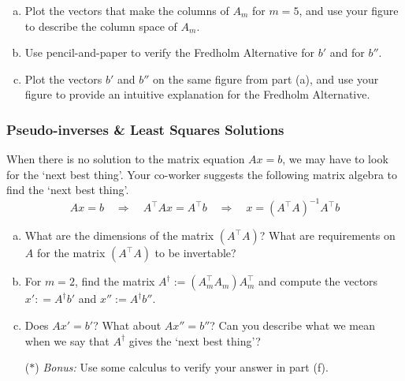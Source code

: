 \begin{enumerate}[(a)]
    \item Plot the vectors that make the columns of $A_m$ for $m = 5$, and use your figure to describe the column space of $A_m$.
    \item Use pencil-and-paper to verify the Fredholm Alternative for $b'$ and for $b''$.
    \item Plot the vectors $b'$ and $b''$ on the same figure from part (a), and use your figure to provide an intuitive explanation for the Fredholm Alternative.
\end{enumerate}


\subsubsection*{Pseudo-inverses \& Least Squares Solutions}
When there is no solution to the matrix equation $Ax = b$, we may have to look for the `next best thing'. Your co-worker suggests the following matrix algebra to find the `next best thing'.
\begin{equation*}
Ax = b \quad \Rightarrow \quad A^\top A x = A^\top b \quad \Rightarrow \quad x = (A^\top A)^{-1} A^\top b
\end{equation*}
\begin{enumerate}[(a), resume]
    \item What are the dimensions of the matrix $(A^\top A)$? What are requirements on $A$ for the matrix $(A^\top A)$ to be invertable?
    \item For $m = 2$, find the matrix $A^\dagger:=(A_m^\top A_m) A_m^\top$ and compute the vectors $x': = A^\dagger b'$ and $x'':=A^\dagger b''$.
    \item Does $Ax' = b'$? What about $Ax'' = b''$? Can you describe what we mean when we say that $A^\dagger$ gives the `next best thing'?
    \item[($\ast$)] \textit{Bonus:} Use some calculus to verify your answer in part (f).
\end{enumerate}

